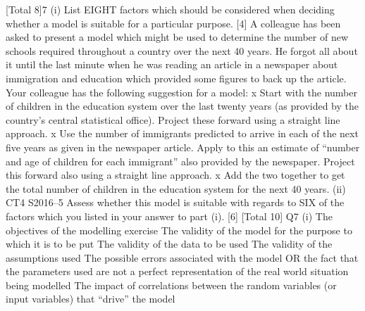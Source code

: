 [Total 8]7
(i)
List EIGHT factors which should be considered when deciding whether a
model is suitable for a particular purpose.
[4]
A colleague has been asked to present a model which might be used to determine the
number of new schools required throughout a country over the next 40 years. He
forgot all about it until the last minute when he was reading an article in a newspaper
about immigration and education which provided some figures to back up the article.
Your colleague has the following suggestion for a model:
x Start with the number of children in the education system over the last twenty
years (as provided by the country’s central statistical office). Project these
forward using a straight line approach.
x Use the number of immigrants predicted to arrive in each of the next five years as
given in the newspaper article. Apply to this an estimate of “number and age of
children for each immigrant” also provided by the newspaper. Project this
forward also using a straight line approach.
x Add the two together to get the total number of children in the education system
for the next 40 years.
(ii)
CT4 S2016–5
Assess whether this model is suitable with regards to SIX of the factors which
you listed in your answer to part (i).
[6]
[Total 10]
Q7
(i)
The objectives of the modelling exercise 
The validity of the model for the purpose to which it is to be put 
The validity of the data to be used 
The validity of the assumptions used 
The possible errors associated with the model OR the fact that the parameters
used are not a perfect representation of the real world situation being modelled 
The impact of correlations between the random variables (or input variables) that
“drive” the model

